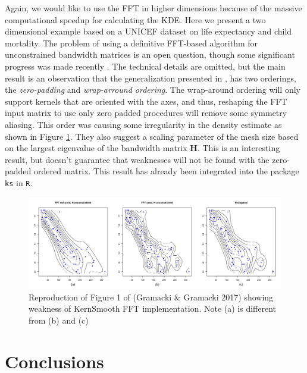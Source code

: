 \documentclass[12pt]{article}
\begin{document}
Again, we would like to use the FFT in higher dimensions because of the
massive computational speedup for calculating the KDE. Here we present a
two dimensional example based on a UNICEF dataset on life expectancy and
child mortality. The problem of using a definitive FFT-based algorithm
for unconstrained bandwidth matrices is an open question, though some
significant progress was made recently \citep{fft_unconstrained}. The
technical details are omitted, but the main result is an observation
that the generalization presented in \citep{wand1994kernel}, has two
orderings, the \emph{zero-padding} and \emph{wrap-arround ordering}. The
wrap-around ordering will only support kernels that are oriented with
the axes, and thus, reshaping the FFT input matrix to use only zero
padded procedures will remove some symmetry aliasing. This order was
causing some irregularity in the density estimate as shown in Figure
\ref{fig:unconstrainedH}. They also suggest a scaling parameter of the
mesh size based on the largest eigenvalue of the bandwidth matrix
\(\mathbf{H}\). This is an interesting result, but doesn't guarantee
that weaknesses will not be found with the zero-padded ordered matrix.
This result has already been integrated into the package \texttt{ks} in
\texttt{R}.

\begin{figure}[h]
\centering
\caption{Reproduction of Figure 1 of (Gramacki \& Gramacki 2017) showing weakness of KernSmooth FFT implementation. Note (a) is different from (b) and (c)}
\label{fig:unconstrainedH}
\includegraphics[scale=.33]{fig1_unconstrained}
\end{figure}

\section{Conclusions}\label{conclusions}
\end{document}
